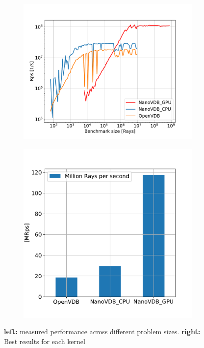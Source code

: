 \begin{figure}[h]
  \begin{subfigure}{0.5\textwidth}
    \includegraphics[width=1\linewidth]{res/results.pdf}

  \end{subfigure}
  \begin{subfigure}{0.4\textwidth}
    \includegraphics[width=1\linewidth]{res/barplot.pdf}
  \end{subfigure}

  \caption{\textbf{left:} measured performance across different problem sizes. \textbf{right:} Best results for each kernel}
  \label{fig:results}
\end{figure}

